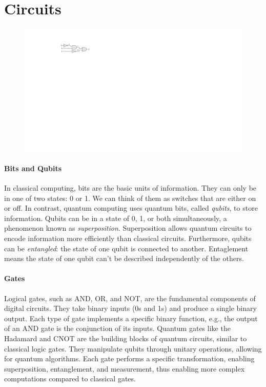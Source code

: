 \section{Circuits} \begin{figure} \includegraphics[]{Figures/HWCircuits/DigitalCircuit} \end{figure}
\newcommand\bstate{b}
\newcommand\qustate{q}

\paragraph{Bits and Qubits}
In classical computing, bits are the basic units of information. 
%
They can only be in one of two states: 0 or 1. 
%
We can think of them as switches that are either on or off. 
%
In contrast, quantum computing uses quantum bits, called {\it qubits}, to store information. Qubits can be in a state of 0, 1, or both simultaneously, a phenomenon known as {\it superposition}. 
%
Superposition allows quantum circuits to encode information more efficiently than classical circuits. 
%
Furthermore, qubits can be {\it entangled}: the state of one qubit is connected to another. 
%
Entaglement means the state of one qubit can't be described independently of the others.

\paragraph{Gates}
Logical gates, such as AND, OR, and NOT, are the fundamental components of digital circuits. 
%
They take binary inputs (0s and 1s) and produce a single binary output.
%
Each type of gate implements a specific binary function, e.g., the output of an AND gate is the conjunction of its inputs.
%
Quantum gates like the Hadamard and CNOT are the building blocks of quantum circuits, similar to classical logic gates. They manipulate qubits through unitary operations, allowing for quantum algorithms. Each gate performs a specific transformation, enabling superposition, entanglement, and measurement, thus enabling more complex computations compared to classical gates.

